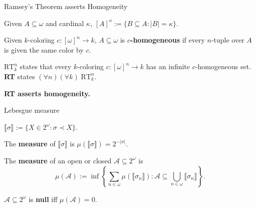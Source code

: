 \begin{frame}{Ramsey's Theorem asserts Homogeneity}
  \begin{notation*}
    Given $A\subseteq\omega$ and cardinal $\kappa$,
    $[A]^\kappa :=\{B\subseteq A:|B|=\kappa\}$.
  \end{notation*}

  \begin{define*}[$c$-homogeneous]
    Given $k$-coloring $c:[\omega]^n\rightarrow k$, $A\subseteq\omega$ is
    \textbf{$c$-homogeneous} if every $n$-tuple over $A$ is given the same
    color by $c$.
  \end{define*}

  \begin{thm*}[Ramsey's]
    \textbf{$\text{RT}_k^n$} states that every $k$-coloring
    $c:[\omega]^n\rightarrow k$ has an infinite $c$-homogeneous set.
    \textbf{RT} states $(\forall n)(\forall k)\; \text{RT}_k^n$.
  \end{thm*}

  \vspace{0.5em}
  \textbf{RT asserts homogeneity.}
\end{frame}

\begin{frame}{Lebesgue measure}
  \begin{notation*}
    $\llbracket\sigma\rrbracket :=\{X\in2^\omega: \sigma\prec X\}$.
  \end{notation*}

  \begin{define*}
    The \textbf{measure} of $\llbracket\sigma\rrbracket$ is
    $\mu(\llbracket\sigma\rrbracket) =2^{-|\sigma|}$.
  \end{define*}

  \begin{define*}
    The \textbf{measure} of an open or closed
    $\mathcal{A}\subseteq2^\omega$ is
    \[\mu(\mathcal{A}):= \inf\left\{\sum_{n\in\omega}
    \mu(\llbracket\sigma_n\rrbracket): \mathcal{A}\subseteq
    \bigcup_{n\in\omega} \llbracket\sigma_n\rrbracket\right\}.\]
  \end{define*}

  \begin{define*}
    $\mathcal{A}\subseteq2^\omega$ is \textbf{null} iff
    $\mu(\mathcal{A})=0$.
  \end{define*}
\end{frame}

